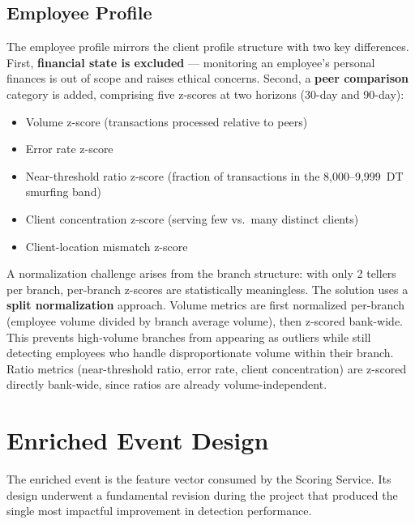 \subsection{Employee Profile}

The employee profile mirrors the client profile structure with two key differences.
First, \textbf{financial state is excluded} --- monitoring an employee's personal
finances is out of scope and raises ethical concerns. Second, a
\textbf{peer comparison} category is added, comprising five z-scores at two horizons
(30-day and 90-day):

\begin{itemize}[leftmargin=2cm]
    \item Volume z-score (transactions processed relative to peers)
    \item Error rate z-score
    \item Near-threshold ratio z-score (fraction of transactions in the
          8,000--9,999~DT smurfing band)
    \item Client concentration z-score (serving few vs.\ many distinct clients)
    \item Client-location mismatch z-score
\end{itemize}

A normalization challenge arises from the branch structure: with only 2 tellers per
branch, per-branch z-scores are statistically meaningless. The solution uses a
\textbf{split normalization} approach. Volume metrics are first normalized per-branch
(employee volume divided by branch average volume), then z-scored bank-wide. This
prevents high-volume branches from appearing as outliers while still detecting
employees who handle disproportionate volume within their branch. Ratio metrics
(near-threshold ratio, error rate, client concentration) are z-scored directly
bank-wide, since ratios are already volume-independent.

\section{Enriched Event Design}
\label{sec:enriched-event-design}

The enriched event is the feature vector consumed by the Scoring Service. Its design
underwent a fundamental revision during the project that produced the single most
impactful improvement in detection performance.

